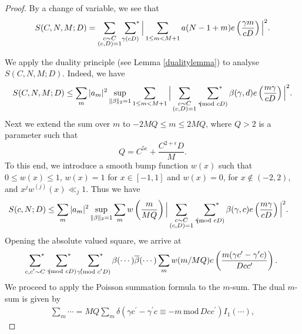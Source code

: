 \documentclass[12pt,a4paper,twoside, reqno]{amsart}
\newcommand{\shortmod}{\ensuremath{\negthickspace \negthickspace \negthickspace \pmod}}
\newcommand{\sumstar}{\sideset{}{^*}\sum}
\begin{document}
\begin{proof}
By a change of variable, we see that 
\begin{align*}
    S(C,N,M;D)= \mathop{\sum_{\substack{c \sim C \\ (c,D)=1}}}\sumstar_{\gamma (cD)}  \Big|\sum_{1 \leq m < M+1} a({N-1+m})  e\left( \frac{\gamma m}{cD} \right) \Big| ^2.
\end{align*}



We  apply the duality principle (see Lemma \ref{dualitylemma}) to analyse $S(C,N,M;D)$. Indeed, we have 
     \begin{align*}
      S(C,N,M;D) \leq 
             \sum_m |a_{m}|^2\sup_{\|\beta\|_2=1} \sum_{1 \leq m < M+1} \Big|    \mathop{\sum_{ \substack{c \sim {C} \\ (c,D)=1 }}} \ \sumstar_{\substack{ \gamma \shortmod{cD } }  }  \beta(\gamma,d)  e\left(\frac{ m \gamma }{cD} \right)   \Big|^2.
\end{align*}
   Next we extend the sum over $m$ to $ -2MQ \leq m \leq 2MQ $, where $Q>2$ is  a parameter  such that $$Q=C^{5\epsilon}+\frac{C^{2+\epsilon}D}{M}. $$ 
   To this end, we introduce 
 a smooth bump function $w(x)$ such that $0\leq w(x)\leq 1$, $w(x)=1$ for $x \in [-1,1] $ and $w(x)=0$, for $x \notin (-2,2)$, and   $x^j w^{(j)}(x) \ll_{j} 1$. Thus we have 
 \begin{align*}
     S(c,N;D)
       &\leq   \sum_m |a_{m}|^2   \sup_{\|\beta\|_2=1} \sum_{m}w\left( \frac{m}{MQ} \right) \Big|  \mathop{\sum_{ \substack{c \sim {C} \\ (c,D)=1 }}} \ \sumstar_{\substack{ \gamma \shortmod{cD } }  }   \beta(\gamma,c)  e\left(\frac{ m \gamma }{cD} \right)   \Big|^2.
\end{align*}
Opening the absolute valued square, we arrive at
\begin{align*}
      \mathop{\sumstar_{ \substack{c, c^\prime \sim  {C} }}} \ \sumstar_{\substack{ \gamma \shortmod{cD}}  } \,\sumstar_{\substack{ \gamma^\prime \shortmod{c^\prime D}}  }   \beta(\cdots) \overline{\beta}(\cdots)  
      \sum_m w(m/MQ) e\left(\frac{ m(\gamma c^\prime-\gamma^\prime c ) }{Dcc^\prime} \right).
\end{align*}
  We proceed to apply the  Poisson summation formula to the $m$-sum. The dual $m$-sum is given by 
   \begin{align}\label{dual m 2-}
    \sum_m \cdots= {MQ}{ }\sum_{m  }  \delta( \gamma c^\prime-\gamma^\prime c \equiv -m\, \mathrm{mod}\, Dcc^\prime)  I_1(\cdots),
\end{align}

\end{proof}
\end{document}
